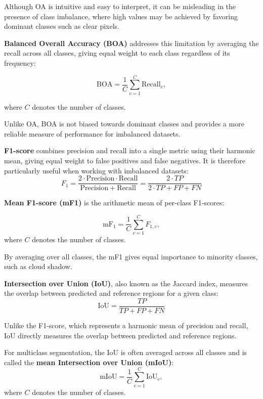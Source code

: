 Although OA is intuitive and easy to interpret, it can be misleading in the presence of class imbalance, where high values may be achieved by favoring dominant classes such as clear pixels.

\textbf{Balanced Overall Accuracy (BOA)} addresses this limitation by averaging the recall across all classes, giving equal weight to each class regardless of its frequency:

\begin{equation}
\mathrm{BOA} = \frac{1}{C}\sum_{c=1}^{C}\mathrm{Recall}_c,
\end{equation}

where $C$ denotes the number of classes. 

Unlike OA, BOA is not biased towards dominant classes and provides a more reliable measure of performance for imbalanced datasets.

\textbf{F1-score} combines precision and recall into a single metric using their harmonic mean, giving equal weight to false positives and false negatives. It is therefore particularly useful when working with imbalanced datasets:
\begin{equation}
F_1 = \frac{2 \cdot \mathrm{Precision} \cdot \mathrm{Recall}}{\mathrm{Precision} + \mathrm{Recall}} = \frac{2 \cdot TP}{2 \cdot TP + FP + FN}
\end{equation}

\textbf{Mean F1-score (mF1)} is the arithmetic mean of per-class F1-scores:

\begin{equation}
\mathrm{mF_1} = \frac{1}{C}\sum_{c=1}^{C}F_{1,c},
\end{equation}
where $C$ denotes the number of classes. 

By averaging over all classes, the mF1 gives equal importance to minority classes, such as cloud shadow.

\textbf{Intersection over Union (IoU)}, also known as the Jaccard index, measures the overlap between predicted and reference regions for a given class:
\begin{equation}
\mathrm{IoU} = \frac{TP}{TP + FP + FN}
\end{equation}

Unlike the F1-score, which represents a harmonic mean of precision and recall, IoU directly measures the overlap between predicted and reference regions.


For multiclass segmentation, the IoU is often averaged across all classes and is called the \textbf{mean Intersection over Union (mIoU)}:
\begin{equation}
\mathrm{mIoU} = \frac{1}{C}\sum_{c=1}^{C}\mathrm{IoU}_c,
\end{equation}
where $C$ denotes the number of classes. 

